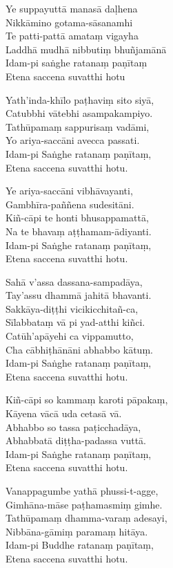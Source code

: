 \begin{paritta}
%
Ye suppayuttā manasā daḷhena\\
Nikkāmino gotama-sāsanamhi\\
Te patti-pattā amataṃ vigayha\\
Laddhā mudhā nibbutiṃ bhuñjamānā\\
Idam-pi saṅghe ratanaṃ paṇītaṃ\\
Etena saccena suvatthi hotu

Yath'inda-khīlo paṭhaviṃ sito siyā,\\
Catubbhi vātebhi asampakampiyo.\\
Tathūpamaṃ sappurisaṃ vadāmi,\\
Yo ariya-saccāni avecca passati.\\
Idam-pi Saṅghe ratanaṃ paṇītaṃ,\\
Etena saccena suvatthi hotu.

Ye ariya-saccāni vibhāvayanti,\\
Gambhīra-paññena sudesitāni.\\
Kiñ-cāpi te honti bhusappamattā,\\
Na te bhavaṃ aṭṭhamam-ādiyanti.\\
Idam-pi Saṅghe ratanaṃ paṇītaṃ,\\
Etena saccena suvatthi hotu.

Sahā v'assa dassana-sampadāya,\\
Tay'assu dhammā jahitā bhavanti.\\
Sakkāya-diṭṭhi vicikicchitañ-ca,\\
Sīlabbataṃ vā pi yad-atthi kiñci.\\
Catūh'apāyehi ca vippamutto,\\
Cha cābhiṭhānāni abhabbo kātuṃ.\\
Idam-pi Saṅghe ratanaṃ paṇītaṃ,\\
Etena saccena suvatthi hotu.

Kiñ-cāpi so kammaṃ karoti pāpakaṃ,\\
Kāyena vācā uda cetasā vā.\\
Abhabbo so tassa paṭicchadāya,\\
Abhabbatā diṭṭha-padassa vuttā.\\
Idam-pi Saṅghe ratanaṃ paṇītaṃ,\\
Etena saccena suvatthi hotu.

Vanappagumbe yathā phussi-t-agge,\\
Gimhāna-māse paṭhamasmiṃ gimhe.\\
Tathūpamaṃ dhamma-varaṃ adesayi,\\
Nibbāna-gāmiṃ paramaṃ hitāya.\\
Idam-pi Buddhe ratanaṃ paṇītaṃ,\\
Etena saccena suvatthi hotu.


\end{paritta}
